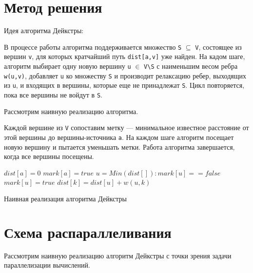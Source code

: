 \documentclass{article}
\newenvironment{myalgorithm}[1][htb]
  {\renewcommand{\algorithmcfname}{Алгоритм}
   \begin{algorithm}[#1]%
  }{\end{algorithm}}
\begin{document}
\newpage

\section{Метод решения}
Идея алгоритма Дейкстры: 

\par В процессе работы алгоритма поддерживается множество \verb|S| $\subseteq$ \verb|V|, состоящее из вершин \verb|v|, для которых кратчайший путь \verb|dist[a,v]| уже найден. На кадом шаге, алгоритм выбирает одну новую вершину \verb|u| $\in$ \verb|V\S| с наименьшим весом ребра \verb|w(u,v)|, добавляет \verb|u| ко множеству \verb|S| и производит релаксацию ребер, выходящих из \verb|u|, и входящих в вершины, которые еще не принадлежат \verb|S|. Цикл повторяется, пока все вершины не войдут в \verb|S|.

\par Рассмотрим наивную реализацию алгоритма.

\par Каждой вершине из \verb|V| сопоставим метку — минимальное известное расстояние от этой вершины до вершины-источника \verb|a|. На каждом шаге алгоритм посещает новую вершину и пытается уменьшать метки. Работа алгоритма завершается, когда все вершины посещены.

\begin{myalgorithm}[H]
\SetAlgoLined
{}
\BlankLine
\BlankLine
$dist[a] = 0$\;
$mark[a] = true$\;
\BlankLine
{} {
 $u = Min(dist[]): mark[u] == false$\;
 $mark[u] = true$\;
 \BlankLine
  {
 	 {
  	$dist[k] = dist[u] + w(u, k)$\;
  } } }
\caption{Наивная реализация алгоритма Дейкстры}
\end{myalgorithm}

\newpage

\section{Схема распараллеливания}
Рассмотрим наивную реализацию алгоритм Дейкстры с точки зрения задачи параллелизации вычислений.
\end{document}
